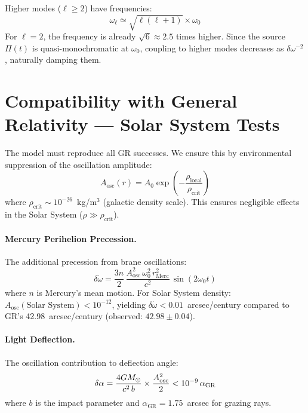 Higher modes ($\ell \ge 2$) have frequencies:
\begin{equation}
\omega_\ell \simeq \sqrt{\ell(\ell+1)} \times \omega_0
\end{equation}
For $\ell = 2$, the frequency is already $\sqrt{6} \approx 2.5$ times higher. Since the source $\Pi(t)$ is quasi-monochromatic at $\omega_0$, coupling to higher modes decreases as $\delta\omega^{-2}$, naturally damping them.

\section{Compatibility with General Relativity --- Solar System Tests}
\label{sec:gr_compat}

The model must reproduce all GR successes. We ensure this by environmental suppression of the oscillation amplitude:
\begin{equation}
A_\text{osc}(r) = A_0\exp\!\left(-\frac{\rho_\text{local}}{\rho_\text{crit}}\right)
\end{equation}
where $\rho_\text{crit} \sim 10^{-26}$~kg/m$^3$ (galactic density scale). This ensures negligible effects in the Solar System ($\rho \gg \rho_\text{crit}$).

\paragraph{Mercury Perihelion Precession.}
The additional precession from brane oscillations:
\begin{equation}
\delta\dot{\omega} = \frac{3n}{2}\,\frac{A_\text{osc}^2\,\omega_0^2\,r_\text{Merc}^2}{c^2}\,\sin(2\omega_0 t)
\end{equation}
where $n$ is Mercury's mean motion. For Solar System density: $A_\text{osc}(\text{Solar System}) < 10^{-12}$, yielding $\delta\dot{\omega} < 0.01$~arcsec/century compared to GR's 42.98~arcsec/century (observed: $42.98 \pm 0.04$).

\paragraph{Light Deflection.}
The oscillation contribution to deflection angle:
\begin{equation}
\delta\alpha = \frac{4GM_\odot}{c^2\,b} \times \frac{A_\text{osc}^2}{2} < 10^{-9}\,\alpha_\text{GR}
\end{equation}
where $b$ is the impact parameter and $\alpha_\text{GR} = 1.75$~arcsec for grazing rays.

